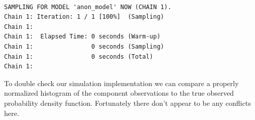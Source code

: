 \documentclass[
  letterpaper,
  DIV=11,
  numbers=noendperiod]{scrartcl}
\newenvironment{Shaded}{\begin{snugshade}}{\end{snugshade}}
\newcommand{\DecValTok}[1]{\textcolor[rgb]{0.68,0.00,0.00}{#1}}
\newcommand{\FunctionTok}[1]{\textcolor[rgb]{0.28,0.35,0.67}{#1}}
\newcommand{\NormalTok}[1]{\textcolor[rgb]{0.00,0.23,0.31}{#1}}
\newcommand{\OtherTok}[1]{\textcolor[rgb]{0.00,0.23,0.31}{#1}}
\newcommand{\SpecialCharTok}[1]{\textcolor[rgb]{0.37,0.37,0.37}{#1}}
\begin{document}
\begin{verbatim}

SAMPLING FOR MODEL 'anon_model' NOW (CHAIN 1).
Chain 1: Iteration: 1 / 1 [100%]  (Sampling)
Chain 1: 
Chain 1:  Elapsed Time: 0 seconds (Warm-up)
Chain 1:                0 seconds (Sampling)
Chain 1:                0 seconds (Total)
Chain 1: 
\end{verbatim}

\begin{Shaded}
\end{Shaded}

To double check our simulation implementation we can compare a properly
normalized histogram of the component observations to the true observed
probability density function. Fortunately there don't appear to be any
conflicts here.
\end{document}
